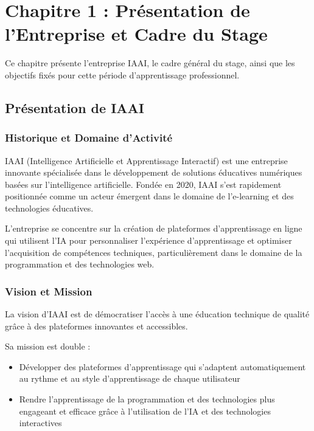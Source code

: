 \chapter{Chapitre 1 : Présentation de l'Entreprise et Cadre du Stage}
\thispagestyle{fancy}
\newpage

Ce chapitre présente l'entreprise IAAI, le cadre général du stage, ainsi que les objectifs fixés pour cette période d'apprentissage professionnel.

\section{Présentation de IAAI}

\subsection{Historique et Domaine d'Activité}
IAAI (Intelligence Artificielle et Apprentissage Interactif) est une entreprise innovante spécialisée dans le développement de solutions éducatives numériques basées sur l'intelligence artificielle. Fondée en 2020, IAAI s'est rapidement positionnée comme un acteur émergent dans le domaine de l'e-learning et des technologies éducatives.

L'entreprise se concentre sur la création de plateformes d'apprentissage en ligne qui utilisent l'IA pour personnaliser l'expérience d'apprentissage et optimiser l'acquisition de compétences techniques, particulièrement dans le domaine de la programmation et des technologies web.

\subsection{Vision et Mission}
La vision d'IAAI est de démocratiser l'accès à une éducation technique de qualité grâce à des plateformes innovantes et accessibles. 

Sa mission est double :
\begin{itemize}
  \item Développer des plateformes d'apprentissage qui s'adaptent automatiquement au rythme et au style d'apprentissage de chaque utilisateur
  \item Rendre l'apprentissage de la programmation et des technologies plus engageant et efficace grâce à l'utilisation de l'IA et des technologies interactives
\end{itemize}

